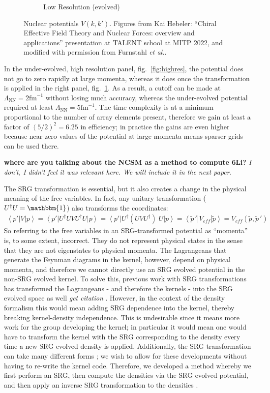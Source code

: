 \documentclass[a4paper,11pt]{article}
\newcommand{\br}[1]{\left\langle #1 \right |}
\newcommand{\kt}[1]{\left| #1 \right \rangle}
\newcommand{\LamNN}{\Lambda_{\mathrm{NN}}}
\newcommand{\etal}{\textit{et al.}}
\newcommand{\ques}[1]{\color{red}\textit{ #1 }\color{black}}
\newcommand{\com}[1]{\color{blue}\small\textbf{ #1 }\color{black}\normalsize}
\begin{document}
\begin{figure}[H]
\begin{subfigure}{0.45\textwidth}
    \caption{Low Resolution (evolved)}
    \label{fig:lowres}
  \end{subfigure}
  \caption{Nuclear potentials $V(k,k')$. Figures from Kai Hebeler:
    ``Chiral Effective Field Theory and Nuclear Forces:
    overview and applications'' presentation at TALENT school at MITP
    2022, and modified with permission from
    Furnstahl \etal \cite{Furnstahl2013}.
  }
  \label{fig:SRGtransform}
\end{figure}
In the under-evolved, high resolution panel, fig.~\ref{fig:highres}, the potential does 
not go to zero rapidly at large momenta, whereas it does once the
transformation is applied in the right panel, fig.~\ref{fig:lowres}. As a
result, a cutoff can be made at $\LamNN=2 \mathrm{fm}^{-1}$ without
losing much accuracy, whereas the under-evolved potential required at least $\LamNN=5 \mathrm{fm}^{-1}$.
The time complexity is at a minimum proportional to the number of array elements
present, therefore we gain at least a factor of $(5/2)^2=6.25$ in efficiency;
in practice the gains are even higher because near-zero values of the potential at large momenta means sparser grids can be used there.

\com{where are you talking about the NCSM as a method to compute 6Li?}\ques{I don't, I didn't feel it was relevant here. We will include it in the next paper.}

The SRG transformation is essential, but it also creates a
change in the physical meaning of the free variables.
In fact, any unitary transformation ($U^\dag U =\mathbbm{1}$) also transforms the coordinates:
\begin{align}
  \br{p'}V\kt{p} 
  = \br{p'} U^\dag U V U^\dag U \kt{p}
  = \br{p'} U^\dag\left( U V U^\dag\right)\;U
  \kt{p}
  = \br{\widetilde{p}\,'} V_{eff}
  \kt{\widetilde{p}}=V_{eff}(\widetilde{p},\widetilde{p}\,')
\end{align}
So referring to the free variables in an SRG-transformed potential as
``momenta'' is, to some extent, incorrect.
They do not represent physical states  in the sense that they are not eigenstates to physical momenta.
The Lagrangeans that generate the Feynman diagrams in the kernel, however,
depend on physical momenta, and therefore we cannot directly use an SRG
evolved potential in the non-SRG evolved kernel.
To solve this, previous work with SRG transformations has transformed the
Lagrangeans - and therefore the kernels - into the SRG evolved space
as well\ques{get citation}.
However, in the context of the density formalism this would mean adding SRG
dependence into the kernel, thereby breaking kernel-density independence. 
This is undesirable since it means more work for the group developing the kernel;
in particular it would mean one would have to transform the kernel with the SRG corresponding to the density every time a 
new SRG evolved density is applied.
Additionally, the SRG transformation can take many different forms \cite{SRG, Furnstahl2013};
we wish to allow for these developments
without having to re-write the kernel code.
Therefore, we developed a method whereby we first perform an SRG, then compute the densities via the SRG evolved potential, and then apply an inverse SRG transformation to the densities \cite{XiangXiang}. 
\end{document}
